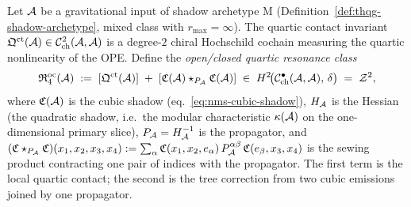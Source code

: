 \begin{construction}
\label{constr:thqg-oc-quartic-resonance}
Let $\mathcal{A}$ be a gravitational input of shadow archetype M
(Definition~\ref{def:thqg-shadow-archetype}, mixed class with
$r_{\max} = \infty$). The quartic contact invariant
$\mathfrak{Q}^{\mathrm{ct}}(\mathcal{A}) \in
\mathcal{C}^2_{\mathrm{ch}}(\mathcal{A}, \mathcal{A})$
is a degree-$2$ chiral Hochschild cochain measuring the quartic
nonlinearity of the OPE. Define the \emph{open/closed quartic
resonance class}
\begin{equation}\label{eq:thqg-oc-quartic}
\mathfrak{R}^{\mathrm{oc}}_{4}(\mathcal{A})
\;:=\;
[\mathfrak{Q}^{\mathrm{ct}}(\mathcal{A})]
\;+\;
[\mathfrak{C}(\mathcal{A}) \star_{P_{\mathcal{A}}} \mathfrak{C}(\mathcal{A})]
\;\in\;
H^2\!\bigl(\mathcal{C}^{\bullet}_{\mathrm{ch}}(\mathcal{A}, \mathcal{A}),\, \delta\bigr)
\;=\; \mathcal{Z}^2,
\end{equation}
where $\mathfrak{C}(\mathcal{A})$ is the cubic shadow
(eq.~\eqref{eq:nms-cubic-shadow}),
$H_{\mathcal{A}}$ is the Hessian (the quadratic shadow, i.e.\ the modular
characteristic $\kappa(\mathcal{A})$ on the one-dimensional primary slice),
$P_{\mathcal{A}} = H_{\mathcal{A}}^{-1}$ is the propagator, and
$(\mathfrak{C} \star_{P_{\mathcal{A}}} \mathfrak{C})(x_1, x_2, x_3, x_4)
:= \sum_\alpha \mathfrak{C}(x_1, x_2, e_\alpha)\, P_{\mathcal{A}}^{\alpha\beta}\,
\mathfrak{C}(e_\beta, x_3, x_4)$
is the sewing product contracting one pair of indices with the
propagator. The first term is the local quartic contact;
the second is the tree correction from two cubic emissions joined
by one propagator.
\end{construction}

